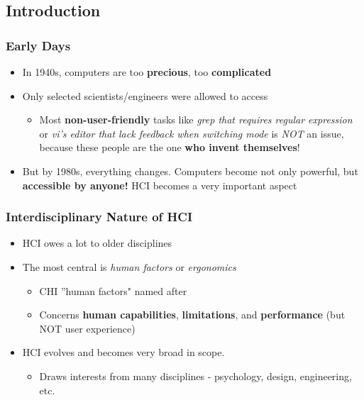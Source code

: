 \documentclass{beamer}
\begin{document}
\subsection{Introduction} %


\begin{frame}
\frametitle{Early Days}
\begin{itemize}
	\item In 1940s, computers are too \textbf{precious}, too \textbf{complicated}
	\item Only selected scientists/engineers were allowed to access
	\begin{itemize}
		\item Most \textbf{non-user-friendly }tasks like \textit{grep that requires regular expression} or \textit{vi's editor that lack feedback when switching mode} is \textit{NOT} an issue, because these people are the one \textbf{who invent themselves}! 
	\end{itemize}
	\item But by 1980s, everything changes.  Computers become not only powerful, but \textbf{accessible by anyone!}  HCI becomes a very important aspect
\end{itemize}
\end{frame}

\begin{frame}
\frametitle{Interdisciplinary Nature of HCI}
\begin{itemize}
	\item HCI owes a lot to older disciplines
	\item The most central is \textit{human factors} or \textit{ergonomics}
	\begin{itemize}
		\item CHI ''human factors" named after
		\item Concerns \textbf{human capabilities}, \textbf{limitations}, and \textbf{performance} (but NOT user experience)
	\end{itemize}
	\item HCI evolves and becomes very broad in scope. 
	\begin{itemize}
	\item Draws interests from many disciplines - psychology, design, engineering, etc.
	\end{itemize}
\end{itemize}
\end{frame}
\end{document}

